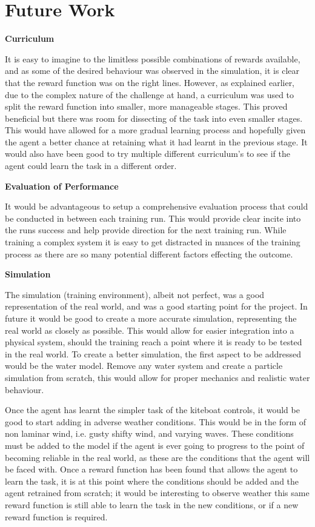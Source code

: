 

\let\textcircled=\pgftextcircled\chapter{Future Work}\label{chap:future_work}

\textbf{Curriculum}

It is easy to imagine to the limitless possible combinations of rewards available, and as some of the desired behaviour was observed in the simulation, it is clear that the reward function was on the right lines. However, as explained earlier, due to the complex nature of the challenge at hand, a curriculum was used to split the reward function into smaller, more manageable stages. This proved beneficial but there was room for dissecting of the task into even smaller stages. This would have allowed for a more gradual learning process and hopefully given the agent a better chance at retaining what it had learnt in the previous stage. It would also have been good to try multiple different curriculum's to see if the agent could learn the task in a different order.


\textbf{Evaluation of Performance}

It would be advantageous to setup a comprehensive evaluation process that could be conducted in between each training run. This would provide clear incite into the runs success and help provide direction for the next training run. While training a complex system it is easy to get distracted in nuances of the training process as there are so many potential different factors effecting the outcome. 

\textbf{Simulation}

The simulation (training environment), albeit not perfect, was a good representation of the real world, and was a good starting point for the project. In future it would be good to create a more accurate simulation, representing the real world as closely as possible. This would allow for easier integration into a physical system, should the training reach a point where it is ready to be tested in the real world. To create a better simulation, the first aspect to be addressed would be the water model. Remove any water system and create a particle simulation from scratch, this would allow for proper mechanics and realistic water behaviour.

Once the agent has learnt the simpler task of the kiteboat controls, it would be good to start adding in adverse weather conditions. This would be in the form of non laminar wind, i.e. gusty shifty wind, and varying waves. These conditions must be added to the model if the agent is ever going to progress to the point of becoming reliable in the real world, as these are the conditions that the agent will be faced with. Once a reward function has been found that allows the agent to learn the task, it is at this point where the conditions should be added and the agent retrained from scratch; it would be interesting to observe weather this same reward function is still able to learn the task in the new conditions, or if a new reward function is required.


